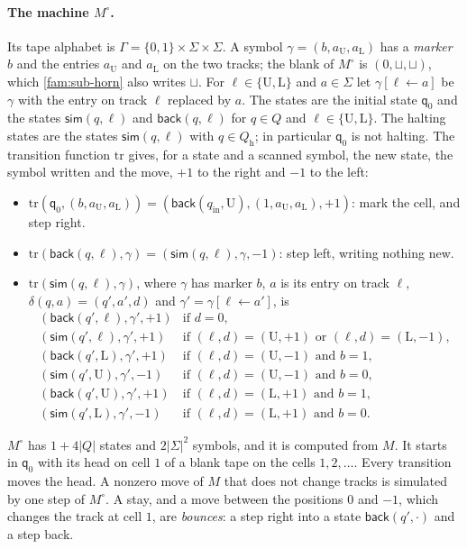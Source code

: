 \paragraph{The machine $M^\circ$.} Its tape alphabet is $\Gamma=\{0,1\}\times\Sigma\times\Sigma$. A symbol $\gamma=(b,a_{\mathrm U},a_{\mathrm L})$ has a \emph{marker} $b$ and the entries $a_{\mathrm U}$ and $a_{\mathrm L}$ on the two tracks; the blank of $M^\circ$ is $(0,\sqcup,\sqcup)$, which \cref{fam:sub-horn} also writes $\sqcup$. For $\ell\in\{\mathrm U,\mathrm L\}$ and $a\in\Sigma$ let $\gamma[\ell\leftarrow a]$ be $\gamma$ with the entry on track $\ell$ replaced by $a$. The states are the initial state $\mathsf q_0$ and the states $\mathsf{sim}(q,\ell)$ and $\mathsf{back}(q,\ell)$ for $q\in Q$ and $\ell\in\{\mathrm U,\mathrm L\}$. The halting states are the states $\mathsf{sim}(q,\ell)$ with $q\in Q_{\mathrm h}$; in particular $\mathsf q_0$ is not halting. The transition function $\mathrm{tr}$ gives, for a state and a scanned symbol, the new state, the symbol written and the move, $+1$ to the right and $-1$ to the left:
\begin{itemize}
\item[(T1)] $\mathrm{tr}(\mathsf q_0,(b,a_{\mathrm U},a_{\mathrm L}))=(\mathsf{back}(q_{\mathrm{in}},\mathrm U),(1,a_{\mathrm U},a_{\mathrm L}),+1)$: mark the cell, and step right.
\item[(T2)] $\mathrm{tr}(\mathsf{back}(q,\ell),\gamma)=(\mathsf{sim}(q,\ell),\gamma,-1)$: step left, writing nothing new.
\item[(T3)] $\mathrm{tr}(\mathsf{sim}(q,\ell),\gamma)$, where $\gamma$ has marker $b$, $a$ is its entry on track $\ell$, $\delta(q,a)=(q',a',d)$ and $\gamma'=\gamma[\ell\leftarrow a']$, is
\[
\begin{array}{ll}
(\mathsf{back}(q',\ell),\gamma',+1) & \text{if } d=0,\\
(\mathsf{sim}(q',\ell),\gamma',+1) & \text{if } (\ell,d)=(\mathrm U,+1)\text{ or }(\ell,d)=(\mathrm L,-1),\\
(\mathsf{back}(q',\mathrm L),\gamma',+1) & \text{if } (\ell,d)=(\mathrm U,-1)\text{ and } b=1,\\
(\mathsf{sim}(q',\mathrm U),\gamma',-1) & \text{if } (\ell,d)=(\mathrm U,-1)\text{ and } b=0,\\
(\mathsf{back}(q',\mathrm U),\gamma',+1) & \text{if } (\ell,d)=(\mathrm L,+1)\text{ and } b=1,\\
(\mathsf{sim}(q',\mathrm L),\gamma',-1) & \text{if } (\ell,d)=(\mathrm L,+1)\text{ and } b=0.
\end{array}
\]
\end{itemize}
$M^\circ$ has $1+4|Q|$ states and $2|\Sigma|^2$ symbols, and it is computed from $M$. It starts in $\mathsf q_0$ with its head on cell $1$ of a blank tape on the cells $1,2,\dots$. Every transition moves the head. A nonzero move of $M$ that does not change tracks is simulated by one step of $M^\circ$. A stay, and a move between the positions $0$ and $-1$, which changes the track at cell $1$, are \emph{bounces}: a step right into a state $\mathsf{back}(q',\cdot)$ and a step back.

